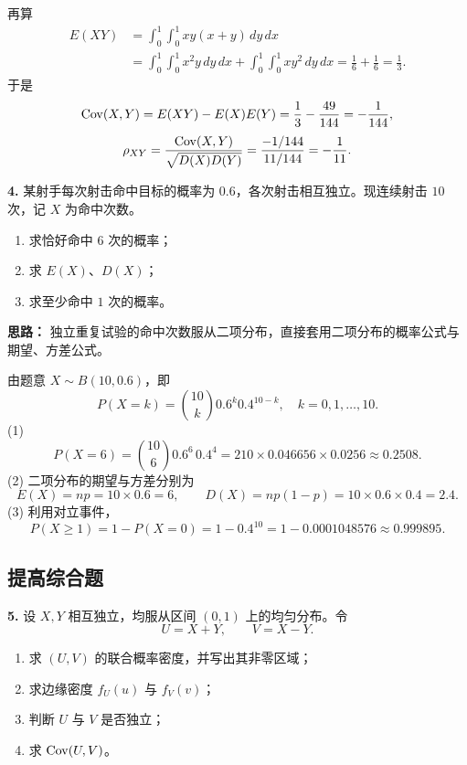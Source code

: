 再算
\[
\begin{aligned}
E(XY)&=\int_0^1\int_0^1xy(x+y)\,dy\,dx\\
&=\int_0^1\int_0^1x^2y\,dy\,dx+\int_0^1\int_0^1xy^2\,dy\,dx
=\frac16+\frac16=\frac13.
\end{aligned}
\]
于是
\[
\operatorname{Cov}(X,Y)=E(XY)-E(X)E(Y)
=\frac13-\frac{49}{144}=-\frac1{144},
\]
\[
\rho_{XY}=\frac{\operatorname{Cov}(X,Y)}{\sqrt{D(X)D(Y)}}
=\frac{-1/144}{11/144}=-\frac1{11}.
\]

\else \answerarea[10] \fi%

\textbf{4.} 某射手每次射击命中目标的概率为 $0.6$，各次射击相互独立。现连续射击 $10$ 次，记 $X$ 为命中次数。
\begin{enumerate}
    \item[(1)] 求恰好命中 $6$ 次的概率；
    \item[(2)] 求 $E(X)$、$D(X)$；
    \item[(3)] 求至少命中 $1$ 次的概率。
\end{enumerate}

\ifshowsolutions%
\textbf{思路：} 独立重复试验的命中次数服从二项分布，直接套用二项分布的概率公式与期望、方差公式。

由题意 $X\sim B(10,0.6)$，即
\[
P(X=k)=\binom{10}{k}0.6^k0.4^{10-k},\quad k=0,1,\ldots,10.
\]
(1)
\[
P(X=6)=\binom{10}{6}0.6^6\,0.4^4
=210\times0.046656\times0.0256
\approx0.2508.
\]
(2) 二项分布的期望与方差分别为
\[
E(X)=np=10\times0.6=6,\qquad
D(X)=np(1-p)=10\times0.6\times0.4=2.4.
\]
(3) 利用对立事件，
\[
P(X\geq1)=1-P(X=0)=1-0.4^{10}
=1-0.0001048576\approx0.999895.
\]

\else \answerarea[8] \fi%

\subsection{提高综合题}

\textbf{5.} 设 $X,Y$ 相互独立，均服从区间 $(0,1)$ 上的均匀分布。令
\[
U=X+Y,\qquad V=X-Y.
\]
\begin{enumerate}
    \item[(1)] 求 $(U,V)$ 的联合概率密度，并写出其非零区域；
    \item[(2)] 求边缘密度 $f_U(u)$ 与 $f_V(v)$；
    \item[(3)] 判断 $U$ 与 $V$ 是否独立；
    \item[(4)] 求 $\operatorname{Cov}(U,V)$。
\end{enumerate}

